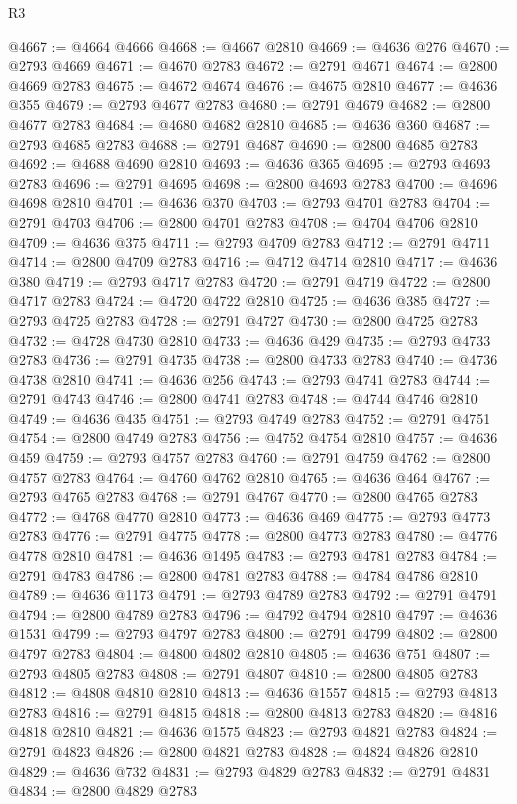 \begin{lexlean}{R3}
\begin{coremodule}
@4667 := @4664 @4666
@4668 := @4667 @2810
@4669 := @4636 @276
@4670 := @2793 @4669
@4671 := @4670 @2783
@4672 := @2791 @4671
@4674 := @2800 @4669 @2783
@4675 := @4672 @4674
@4676 := @4675 @2810
@4677 := @4636 @355
@4679 := @2793 @4677 @2783
@4680 := @2791 @4679
@4682 := @2800 @4677 @2783
@4684 := @4680 @4682 @2810
@4685 := @4636 @360
@4687 := @2793 @4685 @2783
@4688 := @2791 @4687
@4690 := @2800 @4685 @2783
@4692 := @4688 @4690 @2810
@4693 := @4636 @365
@4695 := @2793 @4693 @2783
@4696 := @2791 @4695
@4698 := @2800 @4693 @2783
@4700 := @4696 @4698 @2810
@4701 := @4636 @370
@4703 := @2793 @4701 @2783
@4704 := @2791 @4703
@4706 := @2800 @4701 @2783
@4708 := @4704 @4706 @2810
@4709 := @4636 @375
@4711 := @2793 @4709 @2783
@4712 := @2791 @4711
@4714 := @2800 @4709 @2783
@4716 := @4712 @4714 @2810
@4717 := @4636 @380
@4719 := @2793 @4717 @2783
@4720 := @2791 @4719
@4722 := @2800 @4717 @2783
@4724 := @4720 @4722 @2810
@4725 := @4636 @385
@4727 := @2793 @4725 @2783
@4728 := @2791 @4727
@4730 := @2800 @4725 @2783
@4732 := @4728 @4730 @2810
@4733 := @4636 @429
@4735 := @2793 @4733 @2783
@4736 := @2791 @4735
@4738 := @2800 @4733 @2783
@4740 := @4736 @4738 @2810
@4741 := @4636 @256
@4743 := @2793 @4741 @2783
@4744 := @2791 @4743
@4746 := @2800 @4741 @2783
@4748 := @4744 @4746 @2810
@4749 := @4636 @435
@4751 := @2793 @4749 @2783
@4752 := @2791 @4751
@4754 := @2800 @4749 @2783
@4756 := @4752 @4754 @2810
@4757 := @4636 @459
@4759 := @2793 @4757 @2783
@4760 := @2791 @4759
@4762 := @2800 @4757 @2783
@4764 := @4760 @4762 @2810
@4765 := @4636 @464
@4767 := @2793 @4765 @2783
@4768 := @2791 @4767
@4770 := @2800 @4765 @2783
@4772 := @4768 @4770 @2810
@4773 := @4636 @469
@4775 := @2793 @4773 @2783
@4776 := @2791 @4775
@4778 := @2800 @4773 @2783
@4780 := @4776 @4778 @2810
@4781 := @4636 @1495
@4783 := @2793 @4781 @2783
@4784 := @2791 @4783
@4786 := @2800 @4781 @2783
@4788 := @4784 @4786 @2810
@4789 := @4636 @1173
@4791 := @2793 @4789 @2783
@4792 := @2791 @4791
@4794 := @2800 @4789 @2783
@4796 := @4792 @4794 @2810
@4797 := @4636 @1531
@4799 := @2793 @4797 @2783
@4800 := @2791 @4799
@4802 := @2800 @4797 @2783
@4804 := @4800 @4802 @2810
@4805 := @4636 @751
@4807 := @2793 @4805 @2783
@4808 := @2791 @4807
@4810 := @2800 @4805 @2783
@4812 := @4808 @4810 @2810
@4813 := @4636 @1557
@4815 := @2793 @4813 @2783
@4816 := @2791 @4815
@4818 := @2800 @4813 @2783
@4820 := @4816 @4818 @2810
@4821 := @4636 @1575
@4823 := @2793 @4821 @2783
@4824 := @2791 @4823
@4826 := @2800 @4821 @2783
@4828 := @4824 @4826 @2810
@4829 := @4636 @732
@4831 := @2793 @4829 @2783
@4832 := @2791 @4831
@4834 := @2800 @4829 @2783

\end{coremodule}
\end{lexlean}
